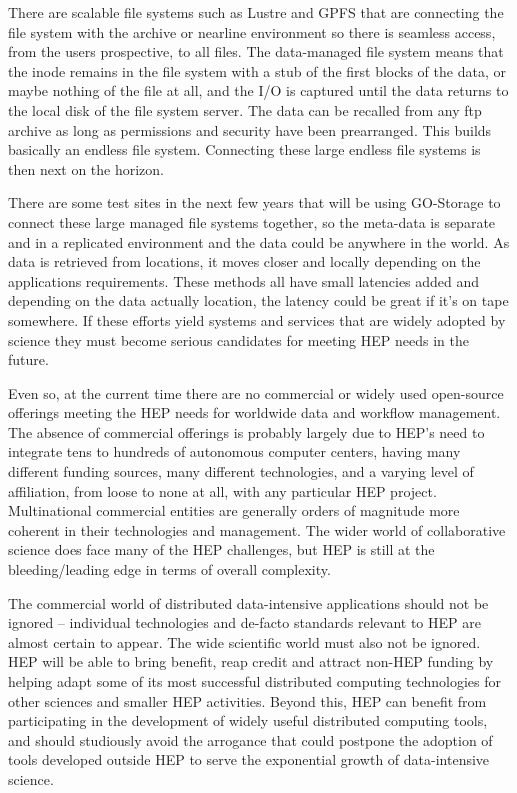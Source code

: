 There are scalable file systems such as Lustre and GPFS that are connecting the file system with the archive or nearline environment so there is seamless access, from the users prospective, to all files.  The data-managed file system means that the inode remains in the file system with a stub of the first blocks of the data, or maybe nothing of the file at all, and the I/O is captured until the data returns to the local disk of the file system server.   The data can be recalled from any ftp archive as long as permissions and security have been prearranged.   This builds basically an endless file system.   Connecting these large endless file systems is then next on the horizon.  

There are some test sites in the next few years that will be using GO-Storage to connect these large managed file systems together, so the meta-data is separate and in a replicated environment and the data could be anywhere in the world.  As data is retrieved from locations, it moves closer and locally depending on the applications requirements.   These methods all have small latencies added and depending on the data actually location, the latency could be great if it’s on tape somewhere.   If these efforts yield systems and services that are widely adopted by science they must become serious candidates for meeting HEP needs in the future.

Even so, at the current time there are no commercial or widely used open-source offerings meeting the HEP needs for worldwide data and workflow management.  The absence of commercial offerings is probably largely due to HEP’s need to integrate tens to hundreds of autonomous computer centers, having many different funding sources, many different technologies, and a varying level of affiliation, from loose to none at all, with any particular HEP project.  Multinational commercial entities are generally orders of magnitude more coherent in their technologies and management.  The wider world of collaborative science does face many of the HEP challenges, but HEP is still at the bleeding/leading edge in terms of overall complexity.

The commercial world of distributed data-intensive applications should not be ignored – individual technologies and de-facto standards relevant to HEP are almost certain to appear.  The wide scientific world must also not be ignored.  HEP will be able to bring benefit, reap credit and attract non-HEP funding by helping adapt some of its most successful distributed computing technologies for other sciences and smaller HEP activities. Beyond this, HEP can benefit from participating in the development of widely useful distributed computing tools, and should studiously avoid the arrogance that could postpone the adoption of tools developed outside HEP to serve the exponential growth of data-intensive science.

